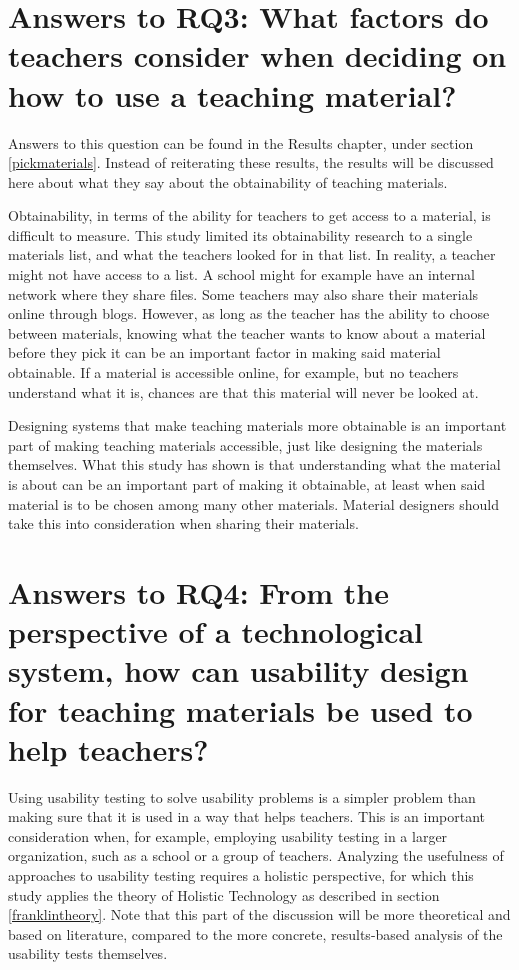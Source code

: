 \section{Answers to RQ3: What factors do teachers consider when deciding on how to use a teaching material?}

Answers to this question can be found in the Results chapter, under section \ref{pickmaterials}. Instead of reiterating these results, the results will be discussed here about what they say about the obtainability of teaching materials.

Obtainability, in terms of the ability for teachers to get access to a material, is difficult to measure. This study limited its obtainability research to a single materials list, and what the teachers looked for in that list. In reality, a teacher might not have access to a list. A school might for example have an internal network where they share files. Some teachers may also share their materials online through blogs. However, as long as the teacher has the ability to choose between materials, knowing what the teacher wants to know about a material before they pick it can be an important factor in making said material obtainable. If a material is accessible online, for example, but no teachers understand what it is, chances are that this material will never be looked at.

Designing systems that make teaching materials more obtainable is an important part of making teaching materials accessible, just like designing the materials themselves. What this study has shown is that understanding what the material is about can be an important part of making it obtainable, at least when said material is to be chosen among many other materials. Material designers should take this into consideration when sharing their materials.

\section{Answers to RQ4: From the perspective of a technological system, how can usability design for teaching materials be used to help teachers?}

Using usability testing to solve usability problems is a simpler problem than making sure that it is used in a way that helps teachers. This is an important consideration when, for example, employing usability testing in a larger organization, such as a school or a group of teachers. Analyzing the usefulness of approaches to usability testing requires a holistic perspective, for which this study applies the theory of Holistic Technology as described in section \ref{franklintheory}. Note that this part of the discussion will be more theoretical and based on literature, compared to the more concrete, results-based analysis of the usability tests themselves.

